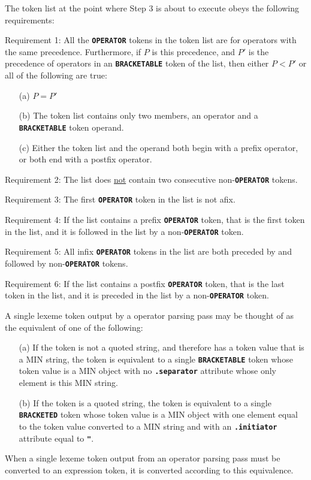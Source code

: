 \documentclass[12pt]{article}
\newcommand{\TT}[1]{{\tt \bfseries #1}}
\newenvironment{itemlist}[1][1.2in]%
	{\begin{list}{}{\setlength{\labelwidth}{#1}%
		        \setlength{\leftmargin}{\labelwidth}%
		        \addtolength{\leftmargin}{+0.2in}%
		        \renewcommand{\makelabel}[1]{##1\hfill}}}%
	{\end{list}}
\begin{document}
The token list at the point where Step 3 is about to execute
obeys the following requirements:
\begin{itemlist}[1.3in]
\item[Requirement 1:] 
All the \TT{OPERATOR} tokens in the token list are for operators
with the same precedence.  Furthermore, if $P$ is this precedence, and
$P'$ is the precedence of operators in an \TT{BRACKETABLE} token of the list,
then either $P<P'$ or all of the following are true:
\begin{itemize}
\item[(a)] $P=P'$
\item[(b)] The token list contains only two members, an operator and
a \TT{BRACK\-ET\-ABLE} token operand.
\item[(c)] Either the token list and the operand both begin with a prefix
operator, or both end with a postfix operator.
\end{itemize}
\item[Requirement 2:] 
The list does \underline{not} contain two consecutive non-\TT{OPERATOR} tokens.
\item[Requirement 3:] 
The first \TT{OPERATOR} token in the list is not afix.
\item[Requirement 4:] 
If the list contains a prefix \TT{OPERATOR} token, that is the first
token in the list, and it is followed in the list by a
non-\TT{OPERATOR} token.
\item[Requirement 5:] 
All infix \TT{OPERATOR} tokens in the list are both preceded by and
followed by non-\TT{OPERATOR} tokens.
\item[Requirement 6:] 
If the list contains a postfix \TT{OPERATOR} token, that is the last
token in the list, and it is preceded in the list by a
non-\TT{OPERATOR} token.
\end{itemlist}

A single
lexeme token output by a operator parsing pass may be
thought of as the equivalent of one of the following:
\begin{itemize}
\item[(a)] If the token is not a quoted string, and therefore
has a token value that is a MIN string, the token is equivalent to
a single \TT{BRACKETABLE} token whose token value is a MIN object
with no \TT{.separator} attribute whose only element is this MIN string.
\item[(b)] If the token is a quoted string, the token is equivalent to
a single \TT{BRACKETED} token whose token value
is a MIN object with one element equal to the
token value converted to a MIN string and with
an \TT{.initiator} attribute equal to \TT{"}.
\end{itemize}
When a single lexeme token output from an operator parsing pass
must be converted to an expression token, it is converted according
to this equivalence.
\end{document}
